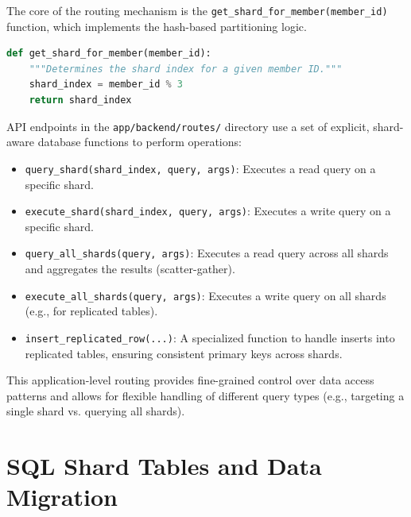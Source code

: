 \documentclass{article}
\begin{document}
The core of the routing mechanism is the \texttt{get\_shard\_for\_member(member\_id)} function, which implements the hash-based partitioning logic.

\begin{lstlisting}[language=Python, caption={Shard determination logic in \texttt{shard\_router.py}}]
def get_shard_for_member(member_id):
    """Determines the shard index for a given member ID."""
    shard_index = member_id % 3
    return shard_index
\end{lstlisting}

API endpoints in the \texttt{app/backend/routes/} directory use a set of explicit, shard-aware database functions to perform operations:
\begin{itemize}
    \item \texttt{query\_shard(shard\_index, query, args)}: Executes a read query on a specific shard.
    \item \texttt{execute\_shard(shard\_index, query, args)}: Executes a write query on a specific shard.
    \item \texttt{query\_all\_shards(query, args)}: Executes a read query across all shards and aggregates the results (scatter-gather).
    \item \texttt{execute\_all\_shards(query, args)}: Executes a write query on all shards (e.g., for replicated tables).
    \item \texttt{insert\_replicated\_row(...)}: A specialized function to handle inserts into replicated tables, ensuring consistent primary keys across shards.
\end{itemize}

This application-level routing provides fine-grained control over data access patterns and allows for flexible handling of different query types (e.g., targeting a single shard vs. querying all shards).

\section{SQL Shard Tables and Data Migration}
\end{document}
